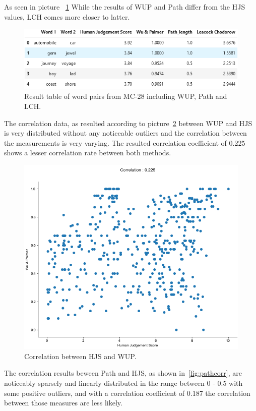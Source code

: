 \documentclass[conference]{IEEEtran}
\begin{document}
As seen in picture ~\ref{fig:hjs} While the results of WUP and Path differ from the HJS values, LCH comes more closer to latter.

\begin{figure}[h]
\centerline{\includegraphics[scale=0.6]{img/hjs.png}}
\caption{Result table of word pairs from MC-28 including WUP, Path and LCH.}
\label{fig:hjs}
\end{figure}

The correlation data, as resulted according to picture~\ref{fig:wupcorr} between WUP and HJS is very distributed without any noticeable outliers and the correlation between the measurements is very varying. The resulted correlation coefficient of 0.225 shows a lesser correlation rate between both methods.

\begin{figure}[h]
\centerline{\includegraphics[scale=0.5]{img/wupcorr.png}}
\caption{Correlation between HJS and WUP.}
\label{fig:wupcorr}
\end{figure}

The correlation results beween Path and HJS, as shown in~\ref{fig:pathcorr}, are noticeably sparsely and linearly distributed in the range between 0 - 0.5 with some positive outliers, and with a correlation coefficient of 0.187 the correlation between those measures are less likely.
\end{document}
